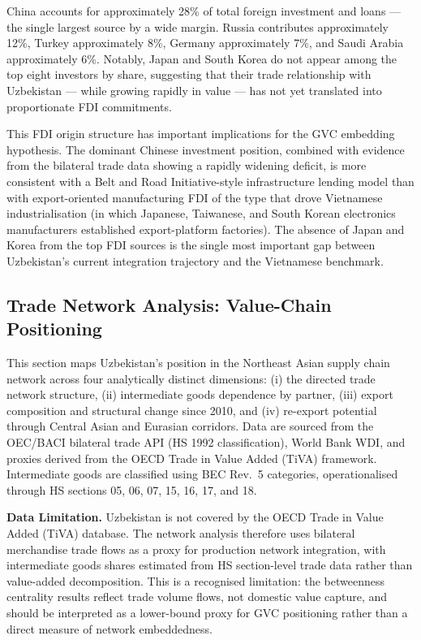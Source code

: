 \documentclass[14pt,a4paper]{extarticle}
\begin{document}
China accounts for approximately 28\% of total foreign investment and loans --- the single largest source by a wide margin. Russia contributes approximately 12\%, Turkey approximately 8\%, Germany approximately 7\%, and Saudi Arabia approximately 6\%. Notably, Japan and South Korea do not appear among the top eight investors by share, suggesting that their trade relationship with Uzbekistan --- while growing rapidly in value --- has not yet translated into proportionate FDI commitments.

This FDI origin structure has important implications for the GVC embedding hypothesis. The dominant Chinese investment position, combined with evidence from the bilateral trade data showing a rapidly widening deficit, is more consistent with a Belt and Road Initiative-style infrastructure lending model than with export-oriented manufacturing FDI of the type that drove Vietnamese industrialisation (in which Japanese, Taiwanese, and South Korean electronics manufacturers established export-platform factories). The absence of Japan and Korea from the top FDI sources is the single most important gap between Uzbekistan's current integration trajectory and the Vietnamese benchmark.


\subsection{Trade Network Analysis: Value-Chain Positioning}\label{sec:network}

This section maps Uzbekistan's position in the Northeast Asian supply chain network across four analytically distinct dimensions: (i) the directed trade network structure, (ii) intermediate goods dependence by partner, (iii) export composition and structural change since 2010, and (iv) re-export potential through Central Asian and Eurasian corridors. Data are sourced from the OEC/BACI bilateral trade API (HS 1992 classification), World Bank WDI, and proxies derived from the OECD Trade in Value Added (TiVA) framework. Intermediate goods are classified using BEC Rev.~5 categories, operationalised through HS sections 05, 06, 07, 15, 16, 17, and 18.

\textbf{Data Limitation.} Uzbekistan is not covered by the OECD Trade in Value Added (TiVA) database. The network analysis therefore uses bilateral merchandise trade flows as a proxy for production network integration, with intermediate goods shares estimated from HS section-level trade data rather than value-added decomposition. This is a recognised limitation: the betweenness centrality results reflect trade volume flows, not domestic value capture, and should be interpreted as a lower-bound proxy for GVC positioning rather than a direct measure of network embeddedness.
\end{document}
